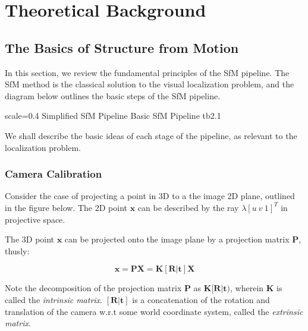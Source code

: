 

\chapter{Theoretical Background}

\section{The Basics of Structure from Motion}
In this section, we review the fundamental principles of the SfM pipeline. The SfM method is the classical solution to the visual localization problem, and the diagram below outlines the basic steps of the SfM pipeline.

       {scale=0.4}%
       {Simplified SfM Pipeline}%
       {Basic SfM Pipeline}%
       {tb2.1}

We shall describe the basic ideas of each stage of the pipeline, as relevant to the localization problem. 

\subsection{Camera Calibration}
Consider the case of projecting a point in 3D to a the image 2D plane, outlined in the figure below. The 2D point $\mathbf{x}$ can be described by the ray $\lambda[u\ v\ 1]^T$ in projective space.

The 3D point $\mathbf{x}$ can be projected onto the image plane by a projection matrix $\mathbf{P}$, thusly:

\[\mathbf{x} = \mathbf{PX} = \mathbf{K[R|t]X}\]

Note the decomposition of the projection matrix $\mathbf{P}$ as $\mathbf{K[R|t})$, wherein \textbf{K} is called the \emph{ intrinsic matrix}. $\mathbf{[R|t]}$ is a concatenation of the rotation and translation of the camera w.r.t some world coordinate system, called the \emph{extrinsic matrix}.

